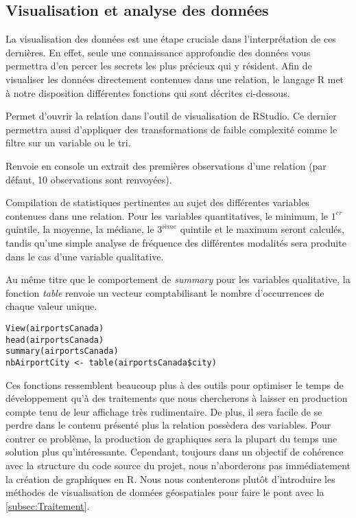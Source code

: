 \subsection{Visualisation et analyse des données}
\label{subsec:Visualisation}

La visualisation des données est une étape cruciale dans l’interprétation de ces dernières. En effet, seule une connaissance approfondie des données vous permettra d'en percer les secrets les plus précieux qui y résident. Afin de visualiser les données directement contenues dans une relation, le langage R met à notre disposition différentes fonctions qui sont décrites ci-dessous. 

\begin{description}[style=multiline,leftmargin=2cm]
		\item[\emph{View}] Permet d'ouvrir la relation dans l'outil de visualisation de RStudio. Ce dernier permettra aussi d'appliquer des transformations de faible complexité comme le filtre sur un variable ou le tri. \cite{Rfunction:View}
		\item[\emph{head}] Renvoie en console un extrait des premières observations d'une relation (par défaut, 10 observations sont renvoyées). \cite{Rfunction:head}
		\item[\emph{summary}] Compilation de statistiques pertinentes au sujet des différentes variables contenues dans une relation. Pour les variables quantitatives, le minimum, le $1^{er}$ quintile, la moyenne, la médiane, le $3^{ième}$ quintile et le maximum seront calculés, tandis qu'une simple analyse de fréquence des différentes modalités sera produite dans le cas d'une variable qualitative.
		\item[\emph{table}] Au même titre que le comportement de \emph{summary} pour les variables qualitative, la fonction \emph{table} renvoie un vecteur comptabilisant le nombre d'occurrences de chaque valeur unique. \cite{Rfunction:table}
\end{description}

\begin{lstlisting}[caption = Fonctions de visualisation de données,label=src:DataVisual]
View(airportsCanada)
head(airportsCanada)
summary(airportsCanada)
nbAirportCity <- table(airportsCanada$city) 
\end{lstlisting}

\vspace{\baselineskip}
Ces fonctions ressemblent beaucoup plus à des outils pour optimiser le temps de développement qu'à des traitements que nous chercherons à laisser en production compte tenu de leur affichage très rudimentaire. De plus, il sera facile de se perdre dans le contenu présenté plus la relation possèdera des variables. Pour contrer ce problème, la production de graphiques sera la plupart du temps une solution plus qu'intéressante. Cependant, toujours dans un objectif de cohérence avec la structure du code source du projet, nous n'aborderons pas immédiatement la création de graphiques en R. Nous nous contenterons plutôt d'introduire les méthodes de visualisation de données géospatiales pour faire le pont avec la \autoref{subsec:Traitement}.\\

